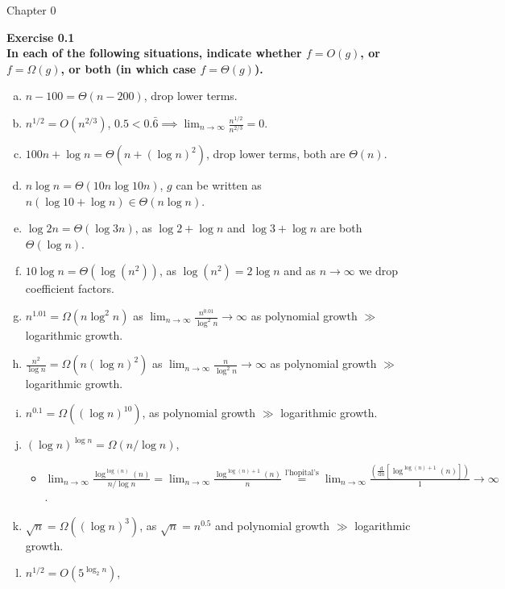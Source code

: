 \documentclass{article}
\newenvironment{problem}[2][Exercise]
    { \begin{mdframed}[backgroundcolor=gray!20] \textbf{#1 #2} \\}
    {  \end{mdframed}}
\begin{document}
\begin{mdframed}[backgroundcolor=blue!20]
Chapter 0
\end{mdframed}

\begin{problem}{0.1}
\textbf{In each of the following situations, indicate whether $f = O(g)$, or $f =\Omega(g)$, or both (in which case $f = \Theta(g)$).}
\begin{enumerate}[(a)]
    \item $n-100=\Theta(n-200)$, drop lower terms.
    \item $n^{1/2}= O(n^{2/3})$, $0.5 < 0.\bar 6\implies\displaystyle\lim_{n\to\infty}\frac{n^{1/2}}{n^{2/3}}=0$.
    \item $100n+\log{n}=\Theta(n+(\log{n})^2)$, drop lower terms, both are $\Theta(n)$.
    \item $n\log n=\Theta(10n\log 10n)$, $g$ can be written as $n(\log10+\log n)\in\Theta(n\log n)$.
    \item $\log 2n=\Theta(\log 3n)$, as $\log 2+\log n$ and $\log 3+\log n$ are both $\Theta(\log n)$.
    \item $10\log n=\Theta(\log(n^2))$, as $\log(n^2)=2\log n$ and as $n\to\infty$ we drop coefficient factors.
    \item $n^{1.01}=\Omega(n\log^2 n)$ as $\displaystyle\lim_{n\to\infty}\frac{n^{0.01}}{\log^2 n}\to\infty$ as polynomial growth $\gg$ logarithmic growth.
    \item $\frac{n^2}{\log n}=\Omega(n(\log n)^2)$ as $\displaystyle\lim_{n\to\infty}\frac{n}{\log^2 n}\to\infty$ as polynomial growth $\gg$ logarithmic growth.
    \item $n^{0.1}=\Omega((\log n)^{10})$, as polynomial growth $\gg$ logarithmic growth.
    \item $(\log n)^{\log n}=\Omega(n/\log n)$, 
        \begin{itemize}
            \item $\displaystyle\lim_{n\to\infty} \frac{\log^{\log(n)}(n)}{n/\log{n}}=\lim_{n\to\infty} \frac{\log^{\log(n)+1}(n)}{n}\stackrel{\text{l'hopital's}}{=}\lim_{n\to\infty}\frac{\left(\frac{\mathrm d}{\mathrm{d}n}\left[\log^{\log(n)+1}(n)\right]\right)}{1}\to\infty$.
        \end{itemize}
    \item $\sqrt n=\Omega((\log n)^3)$, as $\sqrt n=n^{0.5}$ and polynomial growth $\gg$ logarithmic growth.
    \item $n^{1/2}=O(5^{\log_2 n})$, 

\end{enumerate}
\end{problem}
\end{document}
